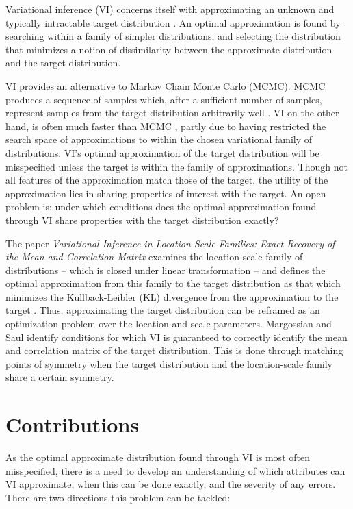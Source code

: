 \documentclass{article}
\begin{document}
Variational inference (VI) concerns itself with approximating an unknown and typically intractable target distribution \cite{blei2017variational}.
An optimal approximation is found by searching within a family of simpler distributions, and selecting the distribution that minimizes a notion of dissimilarity between the approximate distribution and the target distribution.

VI provides an alternative to Markov Chain Monte Carlo (MCMC).
MCMC produces a sequence of samples which, after a sufficient number of samples, represent samples from the target distribution arbitrarily well \cite{speagle2019conceptual}.
VI on the other hand, is often much faster than MCMC \cite{blei2017variational}, partly due to having restricted the search space of approximations to within the chosen variational family of distributions.
VI's optimal approximation of the target distribution will be misspecified unless the target is within the family of approximations.
Though not all features of the approximation match those of the target, the utility of the approximation lies in sharing properties of interest with the target.
An open problem is: under which conditions does the optimal approximation found through VI share properties with the target distribution exactly?

The paper \textit{Variational Inference in Location-Scale Families: Exact Recovery of the Mean and Correlation Matrix}
examines the location-scale family of distributions -- which is closed under linear transformation --
and defines the optimal approximation from this family to the target distribution as that which minimizes the Kullback-Leibler (KL) divergence from the approximation to the target \cite{margossian2024variational}.
Thus, approximating the target distribution can be reframed as an optimization problem over the location and scale parameters.
Margossian and Saul identify conditions for which VI is guaranteed to correctly identify the mean and correlation matrix of the target distribution.
This is done through matching points of symmetry when the target distribution and the location-scale family share a certain symmetry.



\section{Contributions}

As the optimal approximate distribution found through VI is most often misspecified, there is a need to develop an understanding of which attributes can VI approximate, when this can be done exactly, and the severity of any errors.
There are two directions this problem can be tackled:
\end{document}
